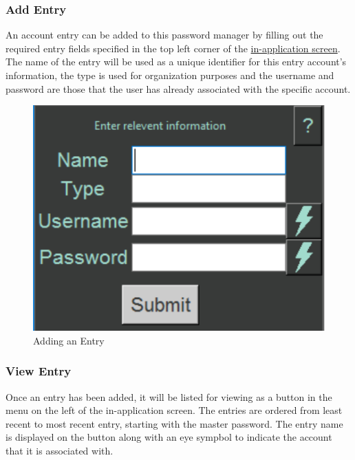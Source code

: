 \documentclass[12pt, titlepage]{article}
\begin{document}
\subsubsection{Add Entry} \label{AddEnt}

An account entry can be added to this password manager by filling out the required entry fields specified in the top left corner of the \hyperref[fig:InApp]{in-application screen}. The name of the entry will be used as a unique identifier for this entry account's information, the type is used for organization purposes and the username and password are those that the user has already associated with the specific account.

\begin{figure}[h]
	\includegraphics[scale=0.3]{images/AddEntry.png}
	\caption{Adding an Entry}
	\label{fig:AdEnt}
\end{figure}

\subsubsection{View Entry} \label{ViewEnt}

Once an entry has been added, it will be listed for viewing as a button in the menu on the left of the in-application screen. The entries are ordered from least recent to most recent entry, starting with the master password. The entry name is displayed on the button along with an eye sympbol to indicate the account that it is associated with.
\end{document}
